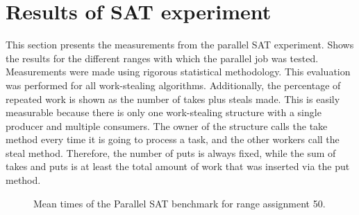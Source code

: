 \clearpage{}

\section{\label{sec:sat-appendix}Results of SAT experiment}

This section presents the measurements from the parallel SAT experiment. Shows the results for the different ranges with which the parallel job was tested. Measurements were made using rigorous statistical methodology. This evaluation was performed for all work-stealing algorithms. Additionally, the percentage of repeated work is shown as the number of takes plus steals made. This is easily measurable because there is only one work-stealing structure with a single producer and multiple consumers. The owner of the structure calls the take method every time it is going to process a task, and the other workers call the steal method. Therefore, the number of puts is always fixed, while the sum of takes and puts is at least the total amount of work that was inserted via the put method.

\begin{figure}[!ht]


  \caption{\label{fig:satapplication:50} Mean times of the Parallel
    SAT benchmark for range assignment 50.}
\end{figure}

